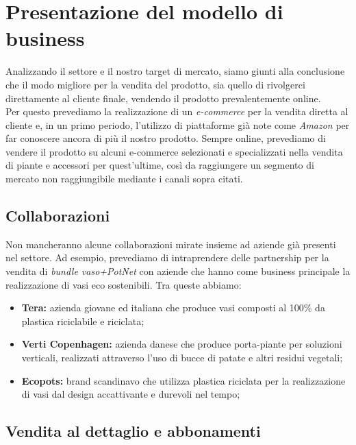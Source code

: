\section{Presentazione del modello di business}

Analizzando il settore e il nostro target di mercato, siamo giunti alla conclusione che il modo migliore per la vendita del prodotto, sia quello di rivolgerci direttamente al cliente finale, vendendo il prodotto prevalentemente online.\\Per questo prevediamo la realizzazione di un \textit{e-commerce} per la vendita diretta al cliente e, in un primo periodo, l'utilizzo di piattaforme già note come \textit{Amazon} per far conoscere ancora di più il nostro prodotto. Sempre online, prevediamo di vendere il prodotto su alcuni e-commerce selezionati e specializzati nella vendita di piante e accessori per quest'ultime, così da raggiungere un segmento di mercato non raggiungibile mediante i canali sopra citati.

\subsection{Collaborazioni}

Non mancheranno alcune collaborazioni mirate insieme ad aziende già presenti nel settore. Ad esempio, prevediamo di intraprendere delle partnership per la vendita di \textit{bundle vaso+PotNet} con aziende che hanno come business principale la realizzazione di vasi eco sostenibili. Tra queste abbiamo:
\begin{itemize}
	\item \textbf{Tera: } azienda giovane ed italiana che produce vasi composti al 100\% da plastica riciclabile e riciclata;
	\item \textbf{Verti Copenhagen: } azienda danese che produce porta-piante per soluzioni verticali, realizzati attraverso l'uso di bucce di patate e altri residui vegetali;
	\item \textbf{Ecopots: } brand scandinavo che utilizza plastica riciclata per la realizzazione di vasi dal design accattivante e durevoli nel tempo;
\end{itemize}


\subsection{Vendita al dettaglio e abbonamenti}

